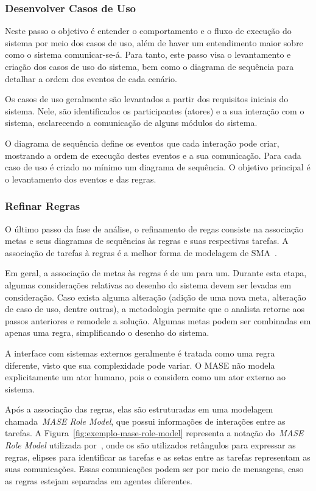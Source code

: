 \subsubsection{Desenvolver Casos de Uso}

Neste passo o objetivo é entender o comportamento e o fluxo de execução do sistema por meio dos casos de uso, além de haver um entendimento maior sobre como o sistema comunicar-se-á. Para tanto, este passo visa o levantamento e criação dos casos de uso do sistema, bem como o diagrama de sequência para detalhar a ordem dos eventos de cada cenário.

Os casos de uso geralmente são levantados a partir dos requisitos iniciais do sistema. Nele, são identificados os participantes (atores) e a sua interação com o sistema, esclarecendo a comunicação de alguns módulos do sistema.

O diagrama de sequência define os eventos que cada interação pode criar, mostrando a ordem de execução destes eventos e a sua comunicação. Para cada caso de uso é criado no mínimo um diagrama de sequência. O objetivo principal é o levantamento dos eventos e das regras.

\subsubsection{Refinar Regras}

O último passo da fase de análise, o refinamento de regas consiste na associação metas e seus diagramas de sequências às regras e suas respectivas tarefas. A associação de tarefas à regras é a melhor forma de modelagem de SMA~\cite{scott01}. 

Em geral, a associação de metas às regras é de um para um. Durante esta etapa, algumas considerações relativas ao desenho do sistema devem ser levadas em consideração. Caso exista alguma alteração (adição de uma nova meta, alteração de caso de uso, dentre outras), a metodologia permite que o analista retorne aos passos anteriores e remodele a solução. Algumas metas podem ser combinadas em apenas uma regra, simplificando o desenho do sistema.

A interface com sistemas externos geralmente é tratada como uma regra diferente, visto que sua complexidade pode variar. O MASE não modela explicitamente um ator humano, pois o considera como um ator externo ao sistema.

Após a associação das regras, elas são estruturadas em uma modelagem chamada~\emph{MASE Role Model}, que possui informações de interações entre as tarefas. A Figura~\ref{fig:exemplo-mase-role-model} representa a notação do~\emph{MASE Role Model} utilizada por~\cite{scott01}, onde os são utilizados retângulos para expressar as regras, elipses para identificar as tarefas e as setas entre as tarefas representam as suas comunicações. Essas comunicações podem ser por meio de mensagens, caso as regras estejam separadas em agentes diferentes.

